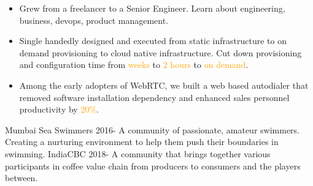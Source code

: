 \documentclass[11pt]{spidercv}
\begin{document}
\begin{MainPart}
{        		
            
            \begin{DoubleColumns}
	            \begin{itemize}
	            	\item[\ding{51}]Grew from a freelancer to a Senior Engineer. Learn about engineering, business, devops, product management.\\ 
            		\item[\ding{51}]Single handedly designed and executed from static infrastructure to on demand provisioning to cloud native infrastructure. Cut down provisioning and configuration time from \textcolor{Orange}{weeks} to \textcolor{Orange}{2 hours} to \textcolor{Orange}{on demand}.\\
            	\end{itemize}
            	\nextcolumn
           		\begin{itemize}
            		\item[\ding{51}]Among the early adopters of WebRTC, we built a web based autodialer that removed software installation dependency and enhanced sales personnel productivity by \textcolor{Orange}{20\%}.
            	\end{itemize}
    		\end{DoubleColumns}
        }

    
    \Experience
        {\ColorHighlight}
		{Mumbai Sea Swimmers}
		{}
		{2016-\faUndo}
        {   
            A community of passionate, amateur swimmers. Creating a nurturing environment to help them push their boundaries in swimming. 
        }
	\Experience
        {\ColorHighlight}
		{IndiaCBC}
		{}
		{2018-\faUndo}
        {   
            A community that brings together various participants in coffee value chain from producers to consumers and the players between.
        }
        
    \end{MainPart}
\end{document}
